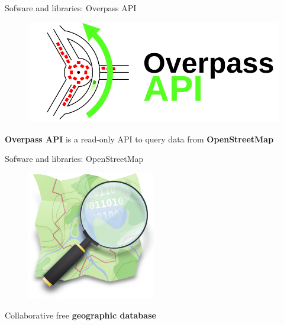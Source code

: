 \documentclass[10pt]{beamer}
\begin{document}
\begin{frame}{Sofware and libraries: Overpass API}
  \Large
  \begin{figure}[H]
      \centering
      \includegraphics[width=\textwidth]{images/OvAPI_logo.png}
  \end{figure}
  \begin{center}
  \Large \textbf{Overpass API} is a read-only API to query data from \textbf{OpenStreetMap}
  \end{center}
\end{frame}

\begin{frame}{Sofware and libraries: OpenStreetMap}
  \Large
  \begin{figure}[H]
      \centering
      \includegraphics[width=0.5\textwidth]{images/osm_logo.png}
  \end{figure}
  \begin{center}
    \Large Collaborative free \textbf{geographic database}
  \end{center}
\end{frame}
\end{document}
